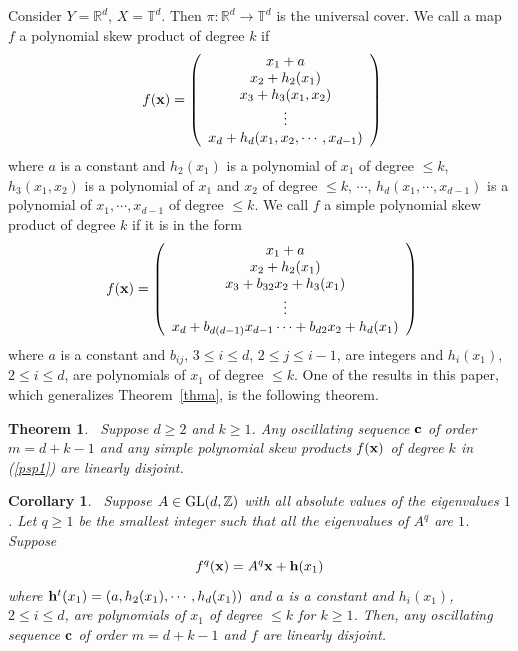 \documentclass[12pt,letterpaper]{amsart}
\newtheorem {theorem}{Theorem}
\newtheorem {corollary}{Corollary}
\newcommand {\Z} {{\mathbb Z}}
\begin{document}
Consider $Y={\mathbb R}^{d}$, $X={\mathbb T}^{d}$.  Then $\pi: {\mathbb R}^{d}\to {\mathbb T}^{d}$ is the universal cover. 
We call a map $f$ a polynomial skew product of degree $k$ if 
\begin{equation}~\label{psp2}
f ({\bf x})= \left(
\begin{array}{c}
x_{1}+ a\\
x_{2} +h_{2} (x_{1})\\
x_{3} +h_{3}(x_{1}, x_{2})\\
\vdots\\
x_{d}+h_{d} (x_{1}, x_{2}, \cdots, x_{d-1})
\end{array}\right)
\end{equation}
where $a$ is a constant and $h_{2} (x_{1})$ is a polynomial of $x_{1}$ of degree $\leq k$, 
$h_{3}(x_{1}, x_{2})$ is a polynomial of $x_{1}$ and $x_{2}$ of degree $\leq k$, $\cdots$, 
$h_{d}(x_{1}, \cdots, x_{d-1})$ is a polynomial of $x_{1}, \cdots, x_{d-1}$ of degree $\leq k$. 
We call $f$ a simple polynomial skew product of degree $k$ if it is in the form
\begin{equation}~\label{psp1}
f ({\bf x})= \left(
\begin{array}{c}
x_{1}+ a\\
x_{2} +h_{2} (x_{1})\\
x_{3} +b_{32}x_{2} +h_{3}(x_{1})\\
\vdots\\
x_{d}+b_{d(d-1)}x_{d-1} \cdots +b_{d2}x_{2}+h_{d} (x_{1})
\end{array}\right)
\end{equation}
where $a$ is a constant and $b_{ij}$, $3\leq i\leq d$, $2\leq j\leq i-1$, are integers and $h_{i} (x_{1})$, $2\leq i\leq d$, are polynomials of $x_{1}$ of degree $\leq k$.
One of the results in this paper, which generalizes Theorem~\ref{thma}, is the following theorem.

\medskip
\begin{theorem}~\label{main}
Suppose $d\geq 2$ and $k\geq 1$. Any oscillating sequence ${\bf c}$ of order $m=d+k-1$ and any simple polynomial skew products $f ({\bf x})$ of degree $k$ in (\ref{psp1}) are linearly disjoint.
\end{theorem}

\medskip
\begin{corollary}~\label{mainc}
Suppose $A\in {\rm GL}(d,\Z)$ with all absolute values of the eigenvalues $1$. Let $q\geq 1$ be the smallest integer such that all the eigenvalues of $A^{q}$ are $1$. Suppose 
$$
f^{q}({\bf x}) =A^{q}{\bf x} +{\bf h} (x_{1})
$$
where ${\bf h}^{t} (x_{1}) =(a, h_{2} (x_{1}), \cdots, h_{d}(x_{1}))$ and $a$ is a constant and $h_{i}(x_{1})$, $2\leq i\leq d$, are polynomials of $x_{1}$ of degree $\leq k$ for $k\geq 1$. 
Then, any oscillating sequence ${\bf c}$ of order $m=d+k-1$ and $f$ are linearly disjoint. 
\end{corollary}
\end{document}

